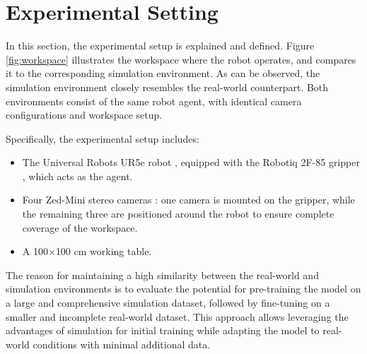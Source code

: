 \section{Experimental Setting}
\label{sec:real_world_exp_setting}
In this section, the experimental setup is explained and defined. Figure \ref{fig:workspace} illustrates the workspace where the robot operates, and compares it to the corresponding simulation environment. As can be observed, the simulation environment closely resembles the real-world counterpart. Both environments consist of the same robot agent, with identical camera configurations and workspace setup.


Specifically, the experimental setup includes:
\begin{itemize}
    \item The Universal Robots UR5e robot \cite{ur5e}, equipped with the Robotiq 2F-85 gripper \cite{robotiq}, which acts as the agent.
    \item Four Zed-Mini stereo cameras \cite{zed}: one camera is mounted on the gripper, while the remaining three are positioned around the robot to ensure complete coverage of the workspace.
    \item A 100$\times$100 cm working table.
\end{itemize}

The reason for maintaining a high similarity between the real-world and simulation environments is to evaluate the potential for pre-training the model on a large and comprehensive simulation dataset, followed by fine-tuning on a smaller and incomplete real-world dataset. This approach allows leveraging the advantages of simulation for initial training while adapting the model to real-world conditions with minimal additional data.

